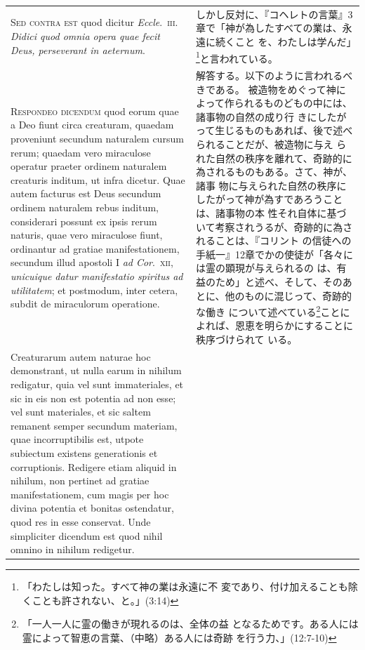\documentclass[paper=a4paper,fontsize=10pt,jafontsize=9pt,titlepage]{jlreq}
\begin{document}
\begin{longtable}{p{21em}p{21em}}
\\


{\scshape  Sed contra est} quod dicitur
{\itshape Eccle}.~{\scshape iii}. {\itshape Didici quod omnia opera quae fecit Deus, perseverant in
aeternum}.

&

しかし反対に、『コヘレトの言葉』3章で「神が為したすべての業は、永遠に続くこと
 を、わたしは学んだ」\footnote{「わたしは知った。すべて神の業は永遠に不
 変であり、付け加えることも除くことも許されない、と。」(3:14)}と言われている。

\\


{\scshape Respondeo dicendum} quod eorum quae a Deo
fiunt circa creaturam, quaedam proveniunt secundum naturalem cursum
rerum; quaedam vero miraculose operatur praeter ordinem naturalem
creaturis inditum, ut infra dicetur. Quae autem facturus est Deus
secundum ordinem naturalem rebus inditum, considerari possunt ex ipsis
rerum naturis, quae vero miraculose fiunt, ordinantur ad gratiae
manifestationem, secundum illud apostoli I {\itshape ad Cor}.~{\scshape xii}, {\itshape unicuique datur
manifestatio spiritus ad utilitatem}; et postmodum, inter cetera, subdit
de miraculorum operatione. 


&

解答する。以下のように言われるべきである。
被造物をめぐって神によって作られるものどもの中には、諸事物の自然の成り行
 きにしたがって生じるものもあれば、後で述べられることだが、被造物に与え
 られた自然の秩序を離れて、奇跡的に為されるものもある。さて、神が、諸事
 物に与えられた自然の秩序にしたがって神が為すであろうことは、諸事物の本
 性それ自体に基づいて考察されうるが、奇跡的に為されることは、『コリント
 の信徒への手紙一』12章でかの使徒が「各々には霊の顕現が与えられるの
 は、有益のため」と述べ、そして、そのあとに、他のものに混じって、奇跡的な働き
 について述べている\footnote{「一人一人に霊の働きが現れるのは、全体の益
 となるためです。ある人には霊によって智恵の言葉、（中略）ある人には奇跡
 を行う力、」(12:7-10)}ことによれば、恩恵を明らかにすることに秩序づけられて
 いる。

\\



Creaturarum autem naturae hoc demonstrant, ut
nulla earum in nihilum redigatur, quia vel sunt immateriales, et sic in
eis non est potentia ad non esse; vel sunt materiales, et sic saltem
remanent semper secundum materiam, quae incorruptibilis est, utpote
subiectum existens generationis et corruptionis. Redigere etiam aliquid
in nihilum, non pertinet ad gratiae manifestationem, cum magis per hoc
divina potentia et bonitas ostendatur, quod res in esse conservat. Unde
simpliciter dicendum est quod nihil omnino in nihilum redigetur.


\end{longtable}
\end{document}
